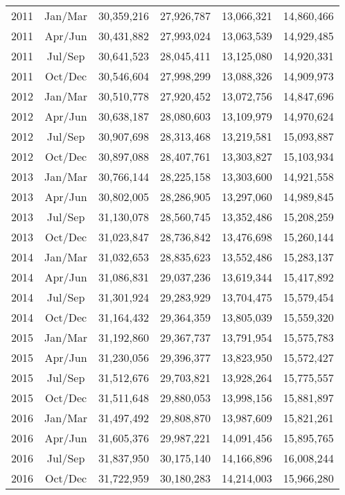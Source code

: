 \documentclass[
]{book}
\begin{document}
\begin{longtable}{ccrrrr}
2011 & Jan/Mar & 30,359,216 & 27,926,787 & 13,066,321 & 14,860,466 \\ 
2011 & Apr/Jun & 30,431,882 & 27,993,024 & 13,063,539 & 14,929,485 \\ 
2011 & Jul/Sep & 30,641,523 & 28,045,411 & 13,125,080 & 14,920,331 \\ 
2011 & Oct/Dec & 30,546,604 & 27,998,299 & 13,088,326 & 14,909,973 \\ 
2012 & Jan/Mar & 30,510,778 & 27,920,452 & 13,072,756 & 14,847,696 \\ 
2012 & Apr/Jun & 30,638,187 & 28,080,603 & 13,109,979 & 14,970,624 \\ 
2012 & Jul/Sep & 30,907,698 & 28,313,468 & 13,219,581 & 15,093,887 \\ 
2012 & Oct/Dec & 30,897,088 & 28,407,761 & 13,303,827 & 15,103,934 \\ 
2013 & Jan/Mar & 30,766,144 & 28,225,158 & 13,303,600 & 14,921,558 \\ 
2013 & Apr/Jun & 30,802,005 & 28,286,905 & 13,297,060 & 14,989,845 \\ 
2013 & Jul/Sep & 31,130,078 & 28,560,745 & 13,352,486 & 15,208,259 \\ 
2013 & Oct/Dec & 31,023,847 & 28,736,842 & 13,476,698 & 15,260,144 \\ 
2014 & Jan/Mar & 31,032,653 & 28,835,623 & 13,552,486 & 15,283,137 \\ 
2014 & Apr/Jun & 31,086,831 & 29,037,236 & 13,619,344 & 15,417,892 \\ 
2014 & Jul/Sep & 31,301,924 & 29,283,929 & 13,704,475 & 15,579,454 \\ 
2014 & Oct/Dec & 31,164,432 & 29,364,359 & 13,805,039 & 15,559,320 \\ 
2015 & Jan/Mar & 31,192,860 & 29,367,737 & 13,791,954 & 15,575,783 \\ 
2015 & Apr/Jun & 31,230,056 & 29,396,377 & 13,823,950 & 15,572,427 \\ 
2015 & Jul/Sep & 31,512,676 & 29,703,821 & 13,928,264 & 15,775,557 \\ 
2015 & Oct/Dec & 31,511,648 & 29,880,053 & 13,998,156 & 15,881,897 \\ 
2016 & Jan/Mar & 31,497,492 & 29,808,870 & 13,987,609 & 15,821,261 \\ 
2016 & Apr/Jun & 31,605,376 & 29,987,221 & 14,091,456 & 15,895,765 \\ 
2016 & Jul/Sep & 31,837,950 & 30,175,140 & 14,166,896 & 16,008,244 \\ 
2016 & Oct/Dec & 31,722,959 & 30,180,283 & 14,214,003 & 15,966,280 \\ 

\end{longtable}
\end{document}
